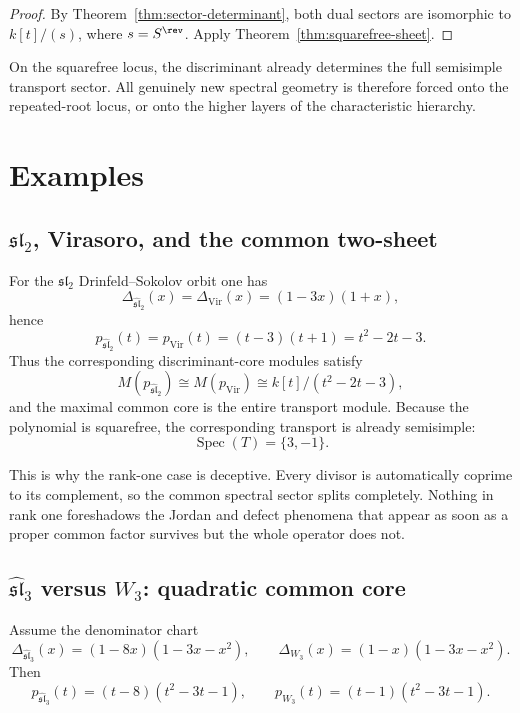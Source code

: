 \begin{proof}
By Theorem~\ref{thm:sector-determinant}, both dual sectors are isomorphic to \(k[t]/(s)\), where \(s=S^{\rev}\).
Apply Theorem~\ref{thm:squarefree-sheet}.
\end{proof}

\begin{remark}
On the squarefree locus, the discriminant already determines the full semisimple transport sector.
All genuinely new spectral geometry is therefore forced onto the repeated-root locus, or onto the higher layers of the characteristic hierarchy.
\end{remark}

\section{Examples}

\subsection{\(\mathfrak{sl}_2\), Virasoro, and the common two-sheet}

For the \(\mathfrak{sl}_2\) Drinfeld--Sokolov orbit one has
\[
\Delta_{\widehat{\mathfrak{sl}}_2}(x)
=
\Delta_{\mathrm{Vir}}(x)
=
(1-3x)(1+x),
\]
hence
\[
p_{\widehat{\mathfrak{sl}}_2}(t)=p_{\mathrm{Vir}}(t)=(t-3)(t+1)=t^2-2t-3.
\]
Thus the corresponding discriminant-core modules satisfy
\[
M(p_{\widehat{\mathfrak{sl}}_2})\cong M(p_{\mathrm{Vir}})
\cong k[t]/(t^2-2t-3),
\]
and the maximal common core is the entire transport module.
Because the polynomial is squarefree, the corresponding transport is already semisimple:
\[
\operatorname{Spec}(T)=\{3,-1\}.
\]

\begin{remark}
This is why the rank-one case is deceptive.
Every divisor is automatically coprime to its complement, so the common spectral sector splits completely.
Nothing in rank one foreshadows the Jordan and defect phenomena that appear as soon as a proper common factor survives but the whole operator does not.
\end{remark}

\subsection{\(\widehat{\mathfrak{sl}}_3\) versus \(W_3\): quadratic common core}

Assume the denominator chart
\[
\Delta_{\widehat{\mathfrak{sl}}_3}(x)=(1-8x)(1-3x-x^2),
\qquad
\Delta_{W_3}(x)=(1-x)(1-3x-x^2).
\]
Then
\[
p_{\widehat{\mathfrak{sl}}_3}(t)=(t-8)(t^2-3t-1),
\qquad
p_{W_3}(t)=(t-1)(t^2-3t-1).
\]

